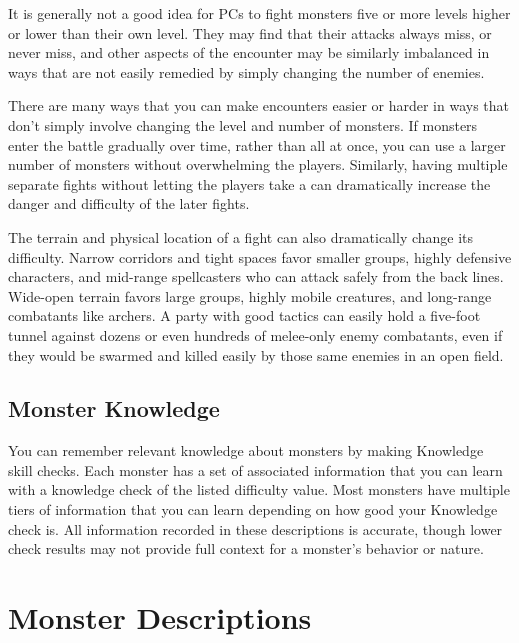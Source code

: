         It is generally not a good idea for PCs to fight monsters five or more levels higher or lower than their own level.
        They may find that their attacks always miss, or never miss, and other aspects of the encounter may be similarly imbalanced in ways that are not easily remedied by simply changing the number of enemies.

        There are many ways that you can make encounters easier or harder in ways that don't simply involve changing the level and number of monsters.
        If monsters enter the battle gradually over time, rather than all at once, you can use a larger number of monsters without overwhelming the players.
        Similarly, having multiple separate fights without letting the players take a  can dramatically increase the danger and difficulty of the later fights.

        The terrain and physical location of a fight can also dramatically change its difficulty.
        Narrow corridors and tight spaces favor smaller groups, highly defensive characters, and mid-range spellcasters who can attack safely from the back lines.
        Wide-open terrain favors large groups, highly mobile creatures, and long-range combatants like archers.
        A party with good tactics can easily hold a five-foot tunnel against dozens or even hundreds of melee-only enemy combatants, even if they would be swarmed and killed easily by those same enemies in an open field.

    \subsection{Monster Knowledge}
        You can remember relevant knowledge about monsters by making Knowledge skill checks.
        Each monster has a set of associated information that you can learn with a knowledge check of the listed difficulty value.
        Most monsters have multiple tiers of information that you can learn depending on how good your Knowledge check is.
        All information recorded in these descriptions is accurate, though lower check results may not provide full context for a monster's behavior or nature.

\section{Monster Descriptions}


